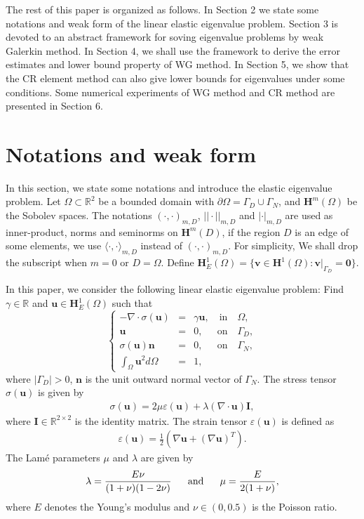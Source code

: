\documentclass[leqno,CJK]{siamltex704}
\numberwithin{equation}{section}
\def\b0{\boldsymbol{0}}
\def\bu{{\mathbf{u}}}
\def\bv{{\mathbf{v}}}
\def\bh{{\mathbf{H}}}
\def\bi{{\mathbf{I}}}
\def\bn{{\mathbf{n}}}
\newcommand{\eps}{\varepsilon}
\newcommand{\Real}{\mathbb{R}}
\begin{document}
The rest of this paper is organized as follows. In Section 2 we state some notations and weak form of the linear elastic eigenvalue problem. Section 3 is devoted to an abstract framework for soving eigenvalue problems by weak Galerkin method. In Section 4, we shall use the framework to derive the error estimates and lower bound property of WG method. In Section 5, we show that the CR element method can also give lower bounds for eigenvalues under some conditions. Some numerical experiments of WG method and CR method are presented in Section 6.
	
\section{Notations and weak form}In this section, we state some notations and introduce the elastic eigenvalue problem. Let $\Omega\subset\Real^2$ be a bounded domain with $\partial\Omega=\Gamma_D\cup\Gamma_N$, and $\bh^m(\Omega)$ be the Sobolev spaces. The notations $(\cdot, \cdot)_{m,D}$, $||\cdot||_{m,D}$ and $|\cdot|_{m,D}$ are used as inner-product, norms and seminorms on $\bh^m(D)$, if the region $D$ is an edge of some elements, we use
$\langle\cdot,\cdot\rangle _{m,D}$ instead of $(\cdot,
\cdot)_{m,D}$. For simplicity, We shall drop the subscript when $m=0$ or
$D=\Omega$. Define $\bh_E^1(\Omega)=\{\bv\in\bh^1(\Omega):\bv|_{\Gamma_D}=\b0\}$.

In this paper, we consider the following linear elastic eigenvalue problem: Find $\gamma\in\Real$ and $\bu\in\bh_E^1(\Omega)$ such that
\begin{equation}\label{eig}
	\left\{
	\begin{array}{rcl}
		-\nabla\cdot \sigma(\bu) &=& \gamma \bu,\quad \text{in}\quad\Omega,\\
		\bu &=& 0,\quad~~ \text{on}\quad\Gamma_D,\\
		\sigma(\bu)\bn &=& 0,\quad~~ \text{on}\quad\Gamma_N,\\
		\int_\Omega \bu^2d\Omega &=& 1,
	\end{array}
	\right.
\end{equation}
where $|\Gamma_D|>0$, $\bn$ is the unit outward normal vector of $\Gamma_N$. The stress tensor $\sigma(\bu)$ is given by
\begin{eqnarray*}
	\sigma(\bu)=2\mu\eps(\bu)+\lambda(\nabla\cdot\bu)\bi,
\end{eqnarray*}
where $\bi\in\Real^{2\times 2}$ is the identity matrix. The strain tensor $\eps(\bu)$ is defined as
\begin{eqnarray*}
	 \eps(\bu)=\frac{1}{2}(\nabla\bu+(\nabla\bu)^T).
\end{eqnarray*}
The Lam\'{e} parameters $\mu$ and $\lambda$ are given by
\begin{eqnarray*}
	\lambda=\frac{E\nu}{(1+\nu)(1-2\nu)}\ \ \ \ \ {\rm and}\ \ \ \ \ \mu=\frac{E}{2(1+\nu)},
\end{eqnarray*}
where $E$ denotes the Young's modulus and $\nu\in(0,0.5)$ is the Poisson ratio.
\end{document}
